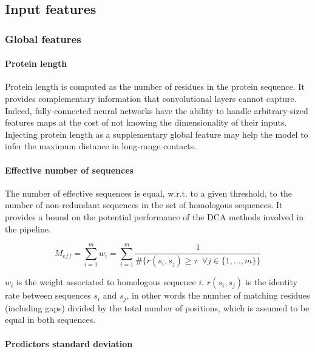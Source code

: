 \subsection{Input features} \label{inputfeatures}

    \subsubsection{Global features}

        \paragraph{Protein length}
    	
      	    Protein length is computed as the number of residues in the protein sequence.
    	    It provides complementary information that convolutional layers cannot capture.
     	    Indeed, fully-connected neural networks have the ability to handle arbitrary-sized
    	    features maps at the cost of not knowing the dimensionality of their inputs.
    	    Injecting protein length as a supplementary global feature may help the model
    	    to infer the maximum distance in long-range contacts.

	   \paragraph{Effective number of sequences} \label{meff}

    	    The number of effective sequences is equal, w.r.t. to a given threshold,
    	    to the number of non-redundant sequences in the set of homologous sequences.
    	    It provides a bound on the potential performance of the DCA methods involved
    	    in the pipeline.

            \begin{equation}
                M_{eff} = \sum_{i=1}^m w_i = \sum_{i=1}^m \frac{1}{\#\{r(s_i, s_j) \ge \tau \, \, \, \forall j \in \{1, \dotsc, m\}\}}
            \end{equation}

            $w_i$ is the weight associated to homologous sequence $i$.
            $r(s_i, s_j)$ is the identity rate between sequences $s_i$ and $s_j$, in other words
            the number of matching residues (including gaps) divided by the total number of positions,
            which is assumed to be equal in both sequences.

        \paragraph{Predictors standard deviation}

